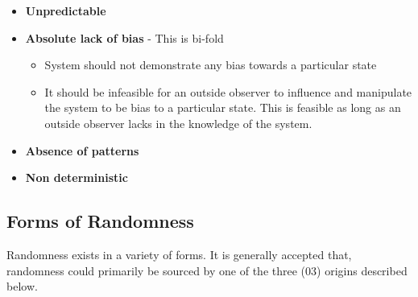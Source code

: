 \begin{itemize}
    \item \textbf{Unpredictable}
    \item \textbf{Absolute lack of bias} - This is bi-fold
    \begin{itemize}
        \item System should not demonstrate any bias towards a particular state
        \item It should be infeasible for an outside observer to influence and manipulate the system to be bias to a particular state. This is feasible as long as an outside observer lacks in the knowledge of the system. 
    \end{itemize}
    \item \textbf{Absence of patterns}
    \item \textbf{Non deterministic}
\end{itemize}

\subsection{Forms of Randomness}

Randomness exists in a variety of forms. It is generally accepted that, randomness could primarily be sourced by one of the three (03) origins described below.

